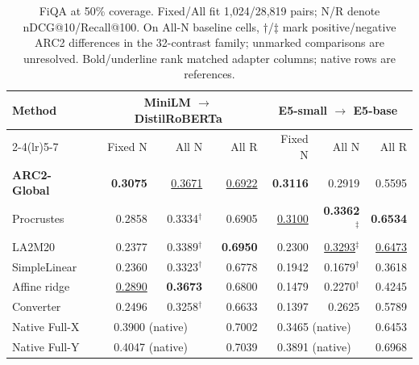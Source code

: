 \begin{table}[t]
\centering
\small
\setlength{\tabcolsep}{4pt}
\caption{FiQA at 50\% coverage. Fixed/All fit 1,024/28,819 pairs; N/R denote nDCG@10/Recall@100. On All-N baseline cells, $\dagger$/$\ddagger$ mark positive/negative ARC2 differences in the 32-contrast family; unmarked comparisons are unresolved. Bold/underline rank matched adapter columns; native rows are references.}\label{tab:allpaid}
\begin{tabular}{lrrrrrr}
\toprule
Method & \multicolumn{3}{c}{MiniLM $\rightarrow$ DistilRoBERTa} & \multicolumn{3}{c}{E5-small $\rightarrow$ E5-base} \\
\cmidrule(lr){2-4}\cmidrule(lr){5-7}
 & Fixed N & All N & All R & Fixed N & All N & All R \\
\midrule
\rowcolor{arcPale}\textbf{ARC2-Global} & \textbf{0.3075} & \underline{0.3671} & \underline{0.6922} & \textbf{0.3116} & 0.2919 & 0.5595 \\
Procrustes & 0.2858 & 0.3334$^{\dagger}$ & 0.6905 & \underline{0.3100} & \textbf{0.3362}$^{\ddagger}$ & \textbf{0.6534} \\
LA2M20 & 0.2377 & 0.3389$^{\dagger}$ & \textbf{0.6950} & 0.2300 & \underline{0.3293}$^{\ddagger}$ & \underline{0.6473} \\
SimpleLinear & 0.2360 & 0.3323$^{\dagger}$ & 0.6778 & 0.1942 & 0.1679$^{\dagger}$ & 0.3618 \\
Affine ridge & \underline{0.2890} & \textbf{0.3673} & 0.6800 & 0.1479 & 0.2270$^{\dagger}$ & 0.4245 \\
Converter & 0.2496 & 0.3258$^{\dagger}$ & 0.6633 & 0.1397 & 0.2625 & 0.5789 \\
\midrule
Native Full-X & \multicolumn{2}{c}{0.3900 (native)} & 0.7002 & \multicolumn{2}{c}{0.3465 (native)} & 0.6453 \\
Native Full-Y & \multicolumn{2}{c}{0.4047 (native)} & 0.7039 & \multicolumn{2}{c}{0.3891 (native)} & 0.6968 \\
\bottomrule
\end{tabular}
\end{table}
